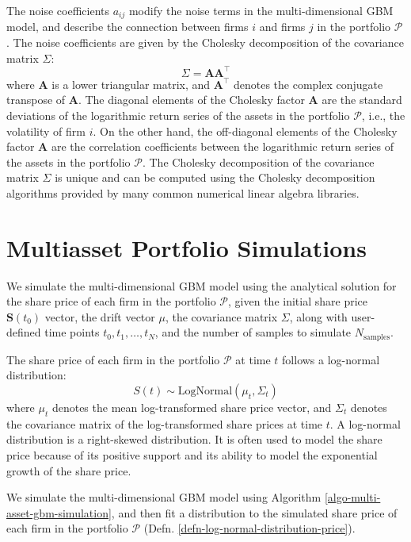 \documentclass[11pt]{article}
\theoremstyle{definition}
\begin{document}
The noise coefficients $a_{ij}$ modify the noise terms in the multi-dimensional GBM model, 
and describe the connection between firms $i$ and firms $j$ in the portfolio $\mathcal{P}$. 
The noise coefficients are given by the Cholesky decomposition of the covariance matrix $\Sigma$:
\begin{equation*}
\Sigma = \mathbf{A}\mathbf{A}^{\top}
\end{equation*}
where $\mathbf{A}$ is a lower triangular matrix, and $\mathbf{A}^{\top}$ denotes the complex conjugate transpose of $\mathbf{A}$. The diagonal elements of the Cholesky factor $\mathbf{A}$ are the standard deviations of the logarithmic return series of the assets in the portfolio $\mathcal{P}$, i.e., the volatility of firm $i$. On the other hand, the off-diagonal elements of the Cholesky factor $\mathbf{A}$ are the correlation coefficients between the logarithmic return series of the assets in the portfolio $\mathcal{P}$. The Cholesky decomposition of the covariance matrix $\Sigma$ is unique and can be computed using the Cholesky decomposition algorithms provided by many common numerical linear algebra libraries.


\section*{Multiasset Portfolio Simulations}
We simulate the multi-dimensional GBM model using the analytical solution for the share price of each firm in the portfolio $\mathcal{P}$, given the initial share price $\mathbf{S}(t_{0})$ vector, the drift vector $\mu$, the covariance matrix $\Sigma$, along with user-defined time points $t_{0},t_{1},\dots,t_{N}$, and the number of samples to simulate $N_{\text{samples}}$. 

\begin{definition}\label{defn-log-normal-distribution-price}
The share price of each firm in the portfolio $\mathcal{P}$ at time $t$ follows a log-normal distribution:
\begin{equation*}
S(t)\sim\text{LogNormal}\left(\mu_{t},\Sigma_{t}\right)
\end{equation*}
where $\mu_{t}$ denotes the mean log-transformed share price vector, and $\Sigma_{t}$ denotes the covariance matrix of the log-transformed share prices at time $t$. A log-normal distribution is a right-skewed distribution. It is often used to model the share price because of its positive support and its ability to model the exponential growth of the share price.
\end{definition}
We simulate the multi-dimensional GBM model using Algorithm \ref{algo-multi-asset-gbm-simulation}, and then fit a distribution to the simulated share price of each firm in the portfolio $\mathcal{P}$ (Defn. \ref{defn-log-normal-distribution-price}).
\end{document}
